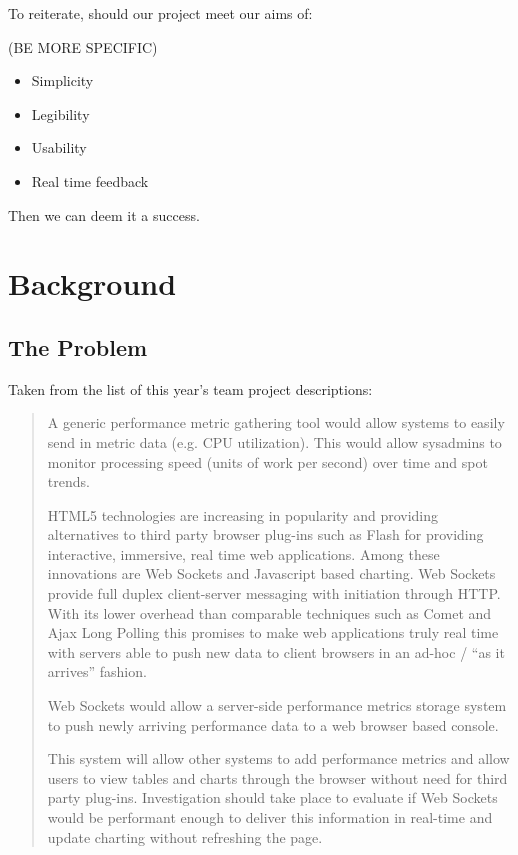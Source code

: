 \documentclass{l3proj}
\begin{document}
To reiterate, should our project meet our aims of:

(BE MORE SPECIFIC)

\begin{itemize}
  \item Simplicity
  \item Legibility
  \item Usability
  \item Real time feedback
\end{itemize}

Then we can deem it a success.



\chapter{Background}
\label{background}

\section{The Problem}
\label{section:problem}


Taken from the list of this year's team project descriptions:

\begin{quotation}
A generic performance metric gathering tool would allow systems to easily send in metric data (e.g. CPU utilization). This would allow sysadmins to monitor processing speed (units of work per second) over time and spot trends.

HTML5 technologies are increasing in popularity and providing alternatives to third party browser plug-ins such as Flash for providing interactive, immersive, real time web applications. Among these innovations are Web Sockets and Javascript based charting.
Web Sockets provide full duplex client-server messaging with initiation through HTTP. With its lower overhead than comparable techniques such as Comet and Ajax Long Polling this promises to make web applications truly real time with servers able to push new data to client browsers in an ad-hoc / ``as it arrives'' fashion.

Web Sockets would allow a server-side performance metrics storage system to push newly arriving performance data to a web browser based console.

This system will allow other systems to add performance metrics and allow users to view tables and charts through the browser without need for third party plug-ins. Investigation should take place to evaluate if Web Sockets would be performant enough to deliver this information in real-time and update charting without refreshing the page.
\end{quotation}
\end{document}
